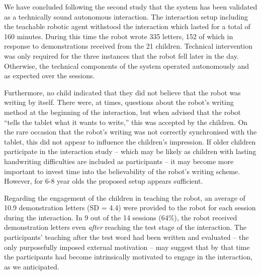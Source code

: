 \documentclass{sig-alternate}
\begin{document}

We have concluded following the second study that the system has 
been validated as a technically sound autonomous interaction. 
The interaction setup including the teachable
robotic agent withstood the interaction which lasted for a total of 160 minutes. 
During this time the robot wrote 335 letters, 152 of which in response to
demonstrations received from the 21 children. Technical 
intervention was only required for the three instances that the robot fell 
later in the day. Otherwise, the technical components of the system operated 
autonomously and as expected over the sessions.

Furthermore, no child indicated that they did not believe that the robot was writing
by itself. There were, at times, 
    questions about the robot's writing method at the beginning of the interaction,
    but when advised that the robot ``tells the tablet what it wants to write,''
    this was accepted by the children. 
    On the rare occasion that the
    robot's writing was not correctly synchronised with the tablet, this did
    not appear to influence the children's impression. 
    If older children participate in the interaction study --
    which may be likely as children with lasting handwriting difficulties are included
    as participants -- it may become more important to invest time into the
    believability of the robot's writing scheme. However, for 6-8 year olds the
    proposed setup appears sufficient.

Regarding the engagement of the children in teaching the robot, 
    an average of 10.9 demonstration letters (SD = 4.4) were
    provided to the robot for each session during the interaction.
    In 9 out of the 14 sessions (64\%), the robot received demonstration letters
    even \emph{after} reaching the test stage of the interaction. The participants'
    teaching after the test word had been written and evaluated -- the only
    purposefully imposed external motivation -- may suggest that by that time
    the participants had become intrinsically motivated to engage in the
    interaction, as we anticipated.
\end{document}
